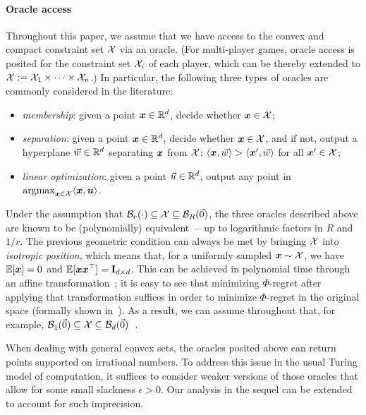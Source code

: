 \paragraph{Oracle access} Throughout this paper, we assume that we have access to the convex and compact constraint set ${\mathcal{X}}$ via an oracle. (For multi-player games, oracle access is posited for the constraint set ${\mathcal{X}}_i$ of each player, which can be thereby extended to ${\mathcal{X}} := {\mathcal{X}}_1 \times \dots \times {\mathcal{X}}_n$.) In particular, the following three types of oracles are commonly considered in the literature:
\begin{itemize}
    \item \emph{membership}: given a point ${\bm{x}} \in \mathbb R^d$, decide whether ${\bm{x}} \in {\mathcal{X}}$;
    \item \emph{separation}: given a point ${\bm{x}} \in \mathbb R^d$, decide whether ${\bm{x}} \in {\mathcal{X}}$, and if not, output a hyperplane $\vec{w} \in \mathbb R^d$ separating ${\bm{x}}$ from ${\mathcal{X}}$: $\langle {\bm{x}}, \vec{w} \rangle > \langle {\bm{x}}', \vec{w} \rangle$ for all ${\bm{x}}' \in {\mathcal{X}}$;
    \item \emph{linear optimization}: given a point $\vec{u} \in \mathbb R^d$, output any point in $\operatorname*{argmax}_{{\bm{x}} \in {\mathcal{X}}} \langle {\bm{x}}, {\bm{u}} \rangle$.
\end{itemize}
Under the assumption that ${\mathcal{B}}_r(\cdot) \subseteq {\mathcal{X}} \subseteq {\mathcal{B}}_R(\vec{0})$, the three oracles described above are known to be (polynomially) equivalent~\citep{Grotschel93:Geometric}---up to logarithmic factors in $R$ and $1/r$. The previous geometric condition can always be met by bringing ${\mathcal{X}}$ into \emph{isotropic position}, which means that, for a uniformly sampled ${\bm{x}} \sim {\mathcal{X}}$, we have $\operatorname*{\mathbb E}[{\bm{x}}] = 0$ and $\operatorname*{\mathbb E}[ {\bm{x}} {\bm{x}}^\top] = {\mathbf{I}}_{d \times d}$. This can be achieved in polynomial time through an affine transformation~\citep{Lovasz06:Simulated,Bourgain96:Random,Kannan97:Random}; it is easy to see that minimizing $\Phi$-regret after applying that transformation suffices in order to minimize $\Phi$-regret in the original space (formally shown in~). As a result, we can assume throughout that, for example, ${\mathcal{B}}_1(\vec{0}) \subseteq {\mathcal{X}} \subseteq {\mathcal{B}}_{d}(\vec{0})$~\citep{Lovasz06:Simulated}.

\begin{remark}
    When dealing with general convex sets, the oracles posited above can return points supported on irrational numbers. To address this issue in the usual Turing model of computation, it suffices to consider weaker versions of those oracles that allow for some small slackness $\epsilon > 0$. Our analysis in the sequel can be extended to account for such imprecision. 
\end{remark}



